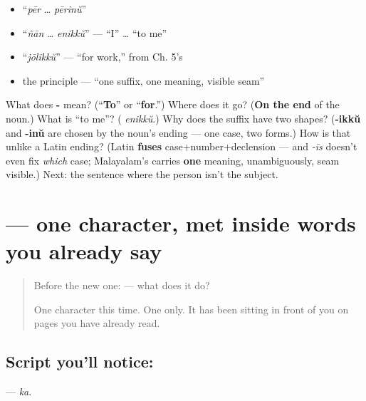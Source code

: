 \begin{itemize}
\raggedright
  \item \textquotedblleft{}\emph{pēr} … \emph{pērinŭ}\textquotedblright{}
  \item \textquotedblleft{}\emph{ñān} … \emph{enikkŭ}\textquotedblright{} — \textquotedblleft{}I\textquotedblright{} … \textquotedblleft{}to me\textquotedblright{}
  \item \textquotedblleft{}\emph{jōlikkŭ}\textquotedblright{} — \textquotedblleft{}for work,\textquotedblright{} from Ch. 5's 
  \item the principle — \textquotedblleft{}one suffix, one meaning, visible seam\textquotedblright{}
\end{itemize}

\begin{tcolorbox}[breakable,colback=teal!4,colframe=teal!35!black,title={Before you move on}]
What does \textbf{-} mean? (\textquotedblleft{}\textbf{To}\textquotedblright{} or \textquotedblleft{}\textbf{for}.\textquotedblright{}) Where does it go? (\textbf{On the end} of the noun.) What is \textquotedblleft{}to me\textquotedblright{}? (\textbf{} \emph{enikkŭ}.) Why does the suffix have two shapes? (\textbf{-ikkŭ} and \textbf{-inŭ} are chosen by the noun's ending — one case, two forms.) How is that unlike a Latin ending? (Latin \textbf{fuses} case+number+declension — and \emph{-īs} doesn't even fix \emph{which} case; Malayalam's carries \textbf{one} meaning, unambiguously, seam visible.) Next: the sentence where the person isn't the subject.
\end{tcolorbox}
\section[\texorpdfstring{\ml{ക} (ka)}{ക (ka)}]{ — one character, met inside words you already say}

\label{lesson:ML-S01-letter-ka}



\begin{quote}
Before the new one:  — what does it do?

One character this time. One only. It has been sitting in front of you on pages you have already read.
\end{quote}

\subsection*{Script you'll notice: }
\textbf{} — \emph{ka}.

